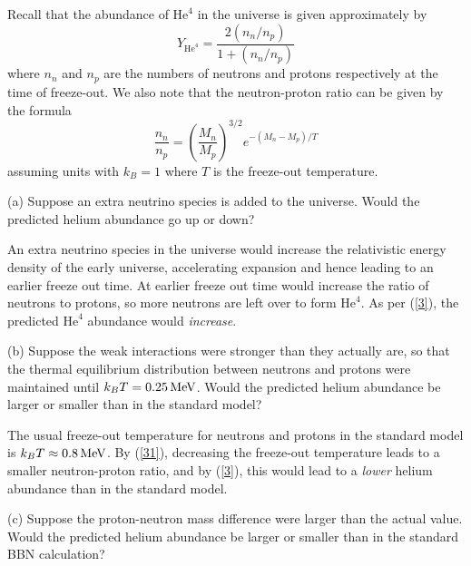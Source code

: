 \documentclass{lkx_pset}
\begin{document}
\begin{problem}{3}
\end{problem}
\begin{solution}
	Recall that the abundance of $\mathrm{He}^4$ in the universe is given approximately by
	\begin{equation}\label{3}
		Y_{\mathrm{He}^4} = \frac{2(n_n/n_p)}{1+(n_n/n_p)}
	\end{equation}
	where $n_n$ and $n_p$ are the numbers of neutrons and protons respectively at the time of freeze-out.
	We also note that the neutron-proton ratio can be given by the formula
	\begin{equation}\label{31}
		\frac{n_n}{n_p} = \left(\frac{M_n}{M_p}\right)^{3/2}e^{-(M_n-M_p)/T}
	\end{equation}
	assuming units with $k_B=1$ where $T$ is the freeze-out temperature.

	\begin{part}{(a)}
		Suppose an extra neutrino species is added to the universe. Would the predicted helium abundance go up or down?
	\end{part}
	An extra neutrino species in the universe would increase the relativistic energy density of the early universe, accelerating expansion and hence leading to an earlier freeze out time. At earlier freeze out time would increase the ratio of neutrons to protons, so more neutrons are left over to form $\mathrm{He}^4$. As per (\ref{3}), the predicted $\mathrm{He}^4$ abundance would \emph{increase}.

	\begin{part}{(b)}
		Suppose the weak interactions were stronger than they actually are, so that the thermal equilibrium distribution between neutrons and protons were maintained until $k_B T = \MeVsi{0.25}$. Would the predicted helium abundance be larger or smaller than in the standard model?
	\end{part}

	The usual freeze-out temperature for neutrons and protons in the standard model is $k_B T \approx \MeVsi{0.8}$. By (\ref{31}), decreasing the freeze-out temperature leads to a smaller neutron-proton ratio, and by (\ref{3}), this would lead to a \emph{lower} helium abundance than in the standard model.

	\begin{part}{(c)}
		Suppose the proton-neutron mass difference were larger than the actual value. Would the predicted helium abundance be larger or smaller than in the standard BBN calculation?
	\end{part}


\end{solution}
\end{document}
